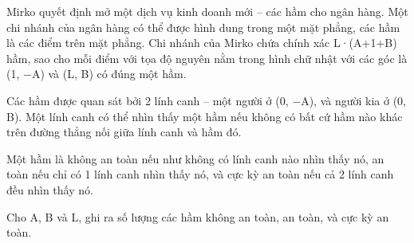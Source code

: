 Mirko quyết định mở một dịch vụ kinh doanh mới – các hầm cho ngân hàng. Một chi nhánh của ngân hàng có thể được hình dung trong một mặt phẳng, các hầm là các điểm trên mặt phẳng. Chi nhánh của Mirko chứa chính xác L·(A+1+B) hầm, sao cho mỗi điểm với tọa độ nguyên nằm trong hình chữ nhật với các góc là (1, −A) và (L, B) có đúng một hầm.  

   Các hầm được quan sát bởi 2 lính canh – một người ở (0, −A),  và người kia ở (0, B). Một lính canh có thể nhìn thấy một hầm nếu không có bất cứ hầm nào khác trên đường thẳng nối giữa lính canh và hầm đó.  

   Một hầm là không an toàn nếu như không có lính canh nào nhìn thấy nó, an toàn nếu chỉ có 1 lính canh nhìn thấy nó, và cực kỳ an toàn nếu cả 2 lính canh đều nhìn thấy nó.  

   Cho A, B và L, ghi ra số lượng các hầm không an toàn, an toàn, và cực kỳ an toàn.  

\